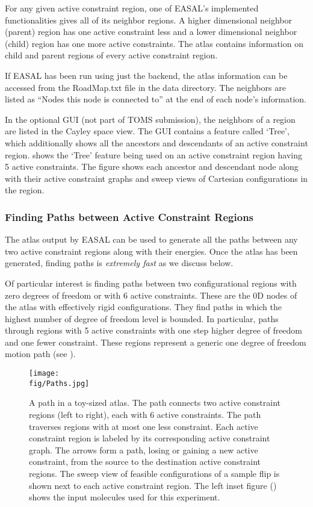 For any given active constraint region, one of EASAL's implemented
functionalities gives all of its neighbor regions.  A higher dimensional
neighbor (parent) region has one active constraint less and a lower dimensional
neighbor (child) region has one more active constraints. The atlas contains
information on child and parent regions of every active constraint region. 

If EASAL has been run using just the backend, the atlas information can be
accessed from the RoadMap.txt file in the data directory.  The neighbors are
listed as ``Nodes this node is connected to'' at the end of each node's
information.

In the optional GUI (not part of TOMS submission), the neighbors of a region
are listed in the Cayley space view.  The GUI contains a feature called `Tree',
which additionally shows all the ancestors and descendants of an active
constraint region.   shows the `Tree' feature being
used on an active constraint region having 5 active constraints. The figure
shows each ancestor and descendant node along with their active constraint
graphs and sweep views of Cartesian configurations in the region.


\subsubsection{Finding Paths between Active Constraint Regions}
The atlas output by EASAL can be used to generate all the paths between any two
active constraint regions along with their energies. Once the atlas has been
generated, finding paths is \emph{extremely fast} as we discuss below.

Of particular interest is finding paths between two configurational regions
with zero degrees of freedom or with 6 active constraints. These are the 0D
nodes of the atlas with effectively rigid configurations. They find
paths in which the highest number of degree of freedom level is bounded. In
particular, paths through regions with 5 active
constraints with one step higher degree of freedom and one fewer constraint.
These regions represent a generic one degree of freedom motion path (see
). 

\begin{figure}[h]
\centering
{}
\texttt{[image: \\fig/Paths.jpg]}
\caption{A path in a toy-sized atlas. The path connects two active constraint
regions (left to right), each with 6 active constraints. The path traverses
regions with at most one less constraint. Each active constraint region is
labeled by its corresponding active constraint graph. The arrows form a path,
losing or gaining a new active constraint, from the source to the destination
active constraint regions.  The sweep view of feasible configurations of a
sample flip is shown next to each active constraint region. The left inset figure 
(\exref{\toyhelix}) shows the input molecules used for this experiment.}
\label{paths}
\end{figure}

